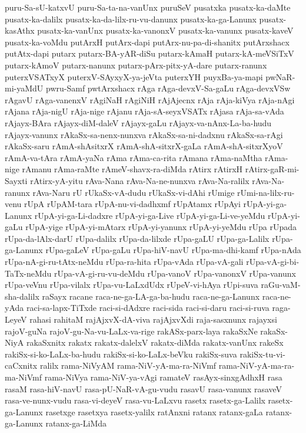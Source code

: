 {puru-Sa-sU-katxvU
puru-Sa-ta-na-vanUnx
puruSeV
pusatxka
pusatx-ka-daMte
pusatx-ka-dalilx
pusatx-ka-da-lilx-ru-vu-danunx
pusatx-ka-ga-Lanunx
pusatx-kasAthx
pusatx-ka-vanUnx
pusatx-ka-vanonxV
pusatx-ka-vanunx
pusatx-kaveV
pusatx-ka-voMdu
putArxH
putArx-dapi
putArx-nu-pa-di-shanitx
putArxshacx
putAtx-dapi
putarx
putarx-BA-yAR-diSu
putarx-kAmaH
putarx-kA-meVSiTxV
putarx-kAmoV
putarx-nanunx
putarx-pArx-pitx-yA-dare
putarx-ranunx
puterxVSATxyX
puterxV-SAyxyX-ya-jeVta
puterxYH
puyxBa-ya-mapi
pwNaR-mi-yaMdU
pwru-Samf
pwtArxshacx
rAga
rAga-devxV-Sa-gaLu
rAga-devxVSw
rAgavU
rAga-vanenxV
rAgiNaH
rAgiNiH
rAjAjecnx
rAja
rAja-kiVya
rAja-nAgi
rAjana
rAja-nigU
rAja-nige
rAjanu
rAja-sA-seyxVSATx
rAjasa
rAja-sa-vAda
rAjayx-BAra
rAjayx-diM-daleV
rAjayx-gaLu
rAjayx-va-nAnx-La-ba-hudu
rAjayx-vanunx
rAkaSx-sa-nenx-nunxva
rAkaSx-sa-ni-dadxnu
rAkaSx-sa-rAgi
rAkaSx-saru
rAmA-shAsitxrX
rAmA-shA-sitxrX-gaLa
rAmA-shA-sitxrXyoV
rAmA-va-tAra
rAmA-yaNa
rAma
rAma-ca-rita
rAmana
rAma-naMtha
rAma-nige
rAmanu
rAma-raMte
rAmeV-shavx-ra-diMda
rAtirx
rAtirxH
rAtirx-gaR-mi-Sayxti
rAtirx-yA-yitu
rAva-Nana
rAva-Na-ne-nunxva
rAva-Na-ralilx
rAva-Na-ranunx
rAva-Naru
rU
rUkaSx-vA-dudu
rUkaSx-vi-dAhi
rUmige
rUmi-na-lilx-ru-venu
rUpA
rUpAM-tara
rUpA-nu-vi-dadhxmf
rUpAtamx
rUpAyi
rUpA-yi-ga-Lanunx
rUpA-yi-ga-Li-dadxre
rUpA-yi-ga-Live
rUpA-yi-ga-Li-ve-yeMdu
rUpA-yi-gaLu
rUpA-yige
rUpA-yi-mAtarx
rUpA-yi-yanunx
rUpA-yi-yeMdu
rUpa
rUpada
rUpa-da-lAlx-darU
rUpa-dalilx
rUpa-da-lilxde
rUpa-gaLU
rUpa-ga-Lalilx
rUpa-ga-Lanunx
rUpa-gaLeV
rUpa-gaLu
rUpa-hiV-navU
rUpa-ma-dhi-kamf
rUpa-nAda
rUpa-nA-gi-ru-tAtx-neMdu
rUpa-ra-hita
rUpa-vAda
rUpa-vA-gali
rUpa-vA-gi-bi-TaTx-neMdu
rUpa-vA-gi-ru-vu-deMdu
rUpa-vanoV
rUpa-vanonxV
rUpa-vanunx
rUpa-veVnu
rUpa-vilalx
rUpa-vu-LaLxdUdx
rUpeV-vi-hAya
rUpi-suva
raGu-vaM-sha-dalilx
raSayx
racane
raca-ne-ga-LA-ga-ba-hudu
raca-ne-ga-Lanunx
raca-ne-yAda
raci-sa-lapx-TiTxde
raci-si-dAdxre
raci-sida
raci-si-daru
raci-si-ruva
raga-LeyeV
rahasi
rahitaM
rajAjxvX-dA-viva
rajAjxvXdi
raja-sasxnunx
rajayxsi
rajoV-guNa
rajoV-gu-Na-vu-LaLx-va-rige
rakASx-parx-laya
rakaSxNe
rakaSx-NiyA
rakaSxnitx
rakatx
rakatx-dalelxV
rakatx-diMda
rakatx-vanUnx
rakeSx
rakiSx-si-ko-LaLx-ba-hudu
rakiSx-si-ko-LaLx-beVku
rakiSx-suva
rakiSx-tu-vi-caCxnitx
ralilx
rama-NiVyAM
rama-NiV-yA-ma-ra-NiVmf
rama-NiV-yA-ma-ra-ma-NiVmf
rama-NiVya
rama-NiV-ya-vAgi
ramateV
rasAyx-sinxgAdhxH
rasa
rasaM
rasa-hiV-navU
rasa-pU-NaR-vA-gu-vudu
rasavU
rasa-vanunx
rasaveV
rasa-ve-nunx-vudu
rasa-vi-deyeV
rasa-vu-LaLxvu
rasetx
rasetx-ga-Lalilx
rasetx-ga-Lanunx
rasetxge
rasetxya
rasetx-yalilx
ratAnxni
ratanx
ratanx-gaLa
ratanx-ga-Lanunx
ratanx-ga-LiMda
}
